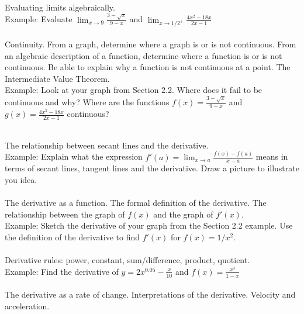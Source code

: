 \documentclass[11pt,fleqn]{article}
\begin{document}
\noindent {}\\
Evaluating limits algebraically.\\

Example: Evaluate $\lim_{x \to 9} \frac{3-\sqrt{x}}{9-x}$ and $\lim_{x \to 1/2^+} \frac{4x^2-18x}{2x-1}$\\

\noindent {}\\
Continuity. From a graph, determine where a graph is or is not continuous. From an algebraic description of a function, determine where a function is or is not continuous. Be able to explain why a function is not continuous at a point. The Intermediate Value Theorem.\\

Example: Look at your graph from Section 2.2. Where does it fail to be continuous and why? Where are the functions $f(x)= \frac{3-\sqrt{x}}{9-x}$ and $g(x)=  \frac{4x^2-18x}{2x-1}$ continuous?


\noindent {}\\
The relationship between secant lines and the derivative.\\

Example: Explain what the expression $f'(a) = \lim_{x \to a} \frac{f(x)-f(a)}{x-a}$ means in terms of secant lines, tangent lines and the derivative. Draw a picture to illustrate you idea.\\

\noindent {}\\
The derivative as a function. The formal definition of the derivative. The relationship between the graph of $f(x)$ and the graph of $f'(x).$\\

Example: Sketch the derivative of your graph from the Section 2.2 example. Use the definition of the derivative to find $f'(x)$ for $f(x)=1/x^2.$\\


\noindent {}\\
Derivative rules: power, constant, sum/difference, product, quotient.\\

Example: Find the derivative of $y=2x^{0.05}-\frac{x}{10}$ and $f(x)=\frac{x^3}{1-x}$\\

\noindent {}\\
The derivative as a rate of change. Interpretations of the derivative. Velocity and acceleration.\\
\end{document}
